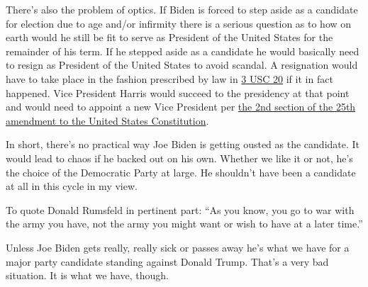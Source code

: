 There's also the problem of optics. If Biden is forced to step aside as
a candidate for election due to age and/or infirmity there is a serious
question as to how on earth would he still be fit to serve as President
of the United States for the remainder of his term. If he stepped aside
as a candidate he would basically need to resign as President of the
United States to avoid scandal. A resignation would have to take place
in the fashion prescribed by law in
\href{https://uscode.house.gov/view.xhtml?req=granuleid:USC-prelim-title3-section20&num=0&edition=prelim}{3
USC 20} if it in fact happened. Vice President Harris would succeed to
the presidency at that point and would need to appoint a new Vice
President per
\href{https://constitution.congress.gov/constitution/amendment-25/}{the
2nd section of the 25th amendment to the United States Constitution}.

In short, there's no practical way Joe Biden is getting ousted as the
candidate. It would lead to chaos if he backed out on his own. Whether
we like it or not, he's the choice of the Democratic Party at large. He
shouldn't have been a candidate at all in this cycle in my view.

To quote Donald Rumsfeld in pertinent part: ``As you know, you go to war
with the army you have, not the army you might want or wish to have at a
later time.''

Unless Joe Biden gets really, really sick or passes away he's what we
have for a major party candidate standing against Donald Trump. That's a
very bad situation. It is what we have, though.
